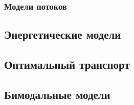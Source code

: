 

\subsubsection{Модели потоков}


\subsection{Энергетические модели}



\subsection{Оптимальный транспорт}



\subsection{Бимодальные модели}



